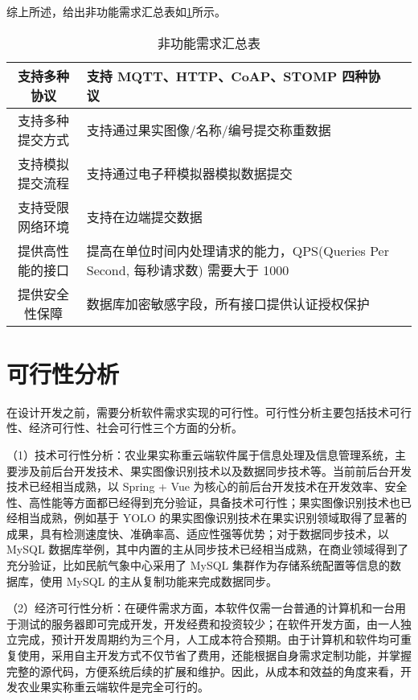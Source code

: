 综上所述，给出非功能需求汇总表如\ref{tab:n-req-summary}所示。

\begin{longtable}[ht]{|c|p{8cm}|c|}
\caption{非功能需求汇总表}
\label{tab:n-req-summary}
\\
\hline
支持多种协议 & 支持 MQTT、HTTP、CoAP、STOMP 四种协议 \\\hline
支持多种提交方式 & 支持通过果实图像/名称/编号提交称重数据 \\\hline
支持模拟提交流程 & 支持通过电子秤模拟器模拟数据提交 \\\hline
支持受限网络环境 & 支持在边端提交数据 \\\hline
提供高性能的接口 & 提高在单位时间内处理请求的能力，QPS(Queries Per Second, 每秒请求数) 需要大于 1000 \\\hline
提供安全性保障 & 数据库加密敏感字段，所有接口提供认证授权保护 \\\hline
\end{longtable}

\section{可行性分析}\label{sec:req3}

在设计开发之前，需要分析软件需求实现的可行性。可行性分析主要包括技术可行性、经济可行性、社会可行性三个方面的分析\cite{叶俊民2006软件工程}。

（1）技术可行性分析：农业果实称重云端软件属于信息处理及信息管理系统，主要涉及前后台开发技术、果实图像识别技术以及数据同步技术等。当前前后台开发技术已经相当成熟，以 Spring + Vue 为核心的前后台开发技术在开发效率、安全性、高性能等方面都已经得到充分验证\cite{Qiu2021}\cite{Shan2021}，具备技术可行性；果实图像识别技术也已经相当成熟，例如基于 YOLO 的果实图像识别技术在果实识别领域取得了显著的成果，具有检测速度快、准确率高、适应性强等优势\cite{Lin2019}；对于数据同步技术，以 MySQL 数据库举例，其中内置的主从同步技术已经相当成熟，在商业领域得到了充分验证，比如民航气象中心采用了 MySQL 集群作为存储系统配置等信息的数据库，使用 MySQL 的主从复制功能来完成数据同步\cite{厍雯轩-2024}。

（2）经济可行性分析：在硬件需求方面，本软件仅需一台普通的计算机和一台用于测试的服务器即可完成开发，开发经费和投资较少；在软件开发方面，由一人独立完成，预计开发周期约为三个月，人工成本符合预期。由于计算机和软件均可重复使用，采用自主开发方式不仅节省了费用，还能根据自身需求定制功能，并掌握完整的源代码，方便系统后续的扩展和维护。因此，从成本和效益的角度来看，开发农业果实称重云端软件是完全可行的。

